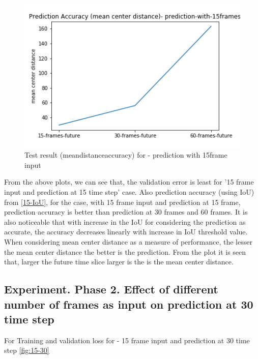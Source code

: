 \begin{figure}[H] 
\includegraphics[scale=0.8]{prediction-with-15frames-mean_distance_accuracy}
\begin{center}
\caption{Test result (mean\textunderscore distance\textunderscore accuracy) for - prediction with 15frame input }
\label{15-mcd}
\end{center}
\end{figure}

From the above plots, we can see that, the validation error is least for '15 frame input and prediction at 15 time step' case. Also prediction accuracy (using IoU) from \ref{15-IoU}, for the case, with 15 frame input and prediction at 15 frame, prediction accuracy is better than prediction at 30 frames and 60 frames. It is also noticeable that with increase in the IoU for considering the prediction as accurate, the accuracy decreases linearly with increase in IoU threshold value. When considering mean center distance as a measure of performance, the lesser the mean center distance the better is the prediction. From the plot it is seen that, larger the future time slice larger is the is the mean center distance.

\subsection{Experiment. Phase 2. Effect of different number of frames as input on prediction at 30  time step}
For Training and validation loss for - 15 frame input and prediction at 30 time step \ref{fig:15-30}

